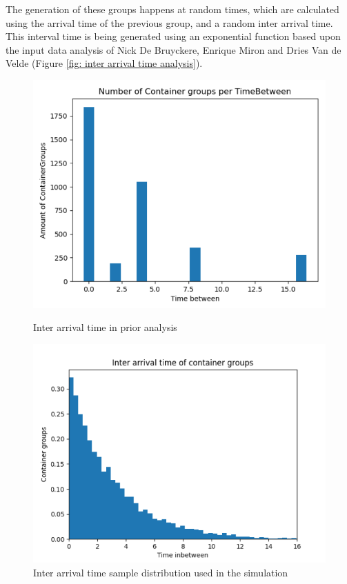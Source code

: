 \documentclass[]{article}
\begin{document}
The generation of these groups happens at random times, which are calculated
using the arrival time of the previous group, and a random inter arrival time.
This interval time is being generated using an exponential function based upon
the input data analysis of Nick De Bruyckere, Enrique Miron and Dries Van de
Velde (Figure \ref{fig: inter arrival time analysis}).
\begin{figure}[!tbp]
	\centering
	\begin{minipage}[b]{0.40\textwidth}
		\includegraphics[width=\textwidth]{Afbeeldingen/inter_arrival_times_hist.png}
		\caption{Inter arrival time in prior analysis}
		\label{fig:inter arrival time analysis}
	\end{minipage}
	\hfill
	\begin{minipage}[b]{0.44\textwidth}
		\includegraphics[width=\textwidth]{Afbeeldingen/inter_arrival_time_sample.png}
		\caption{Inter arrival time sample distribution used in the simulation}
	\end{minipage}
\end{figure}
\end{document}

